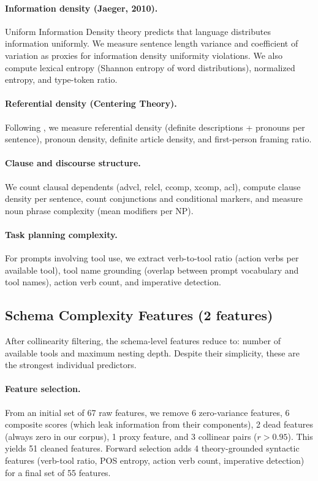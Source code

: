 \documentclass{article}
\begin{document}
\paragraph{Information density (Jaeger, 2010).}
Uniform Information Density theory predicts that language distributes information uniformly. We measure sentence length variance and coefficient of variation as proxies for information density uniformity violations. We also compute lexical entropy (Shannon entropy of word distributions), normalized entropy, and type-token ratio.

\paragraph{Referential density (Centering Theory).}
Following \citet{grosz1995centering}, we measure referential density (definite descriptions + pronouns per sentence), pronoun density, definite article density, and first-person framing ratio.

\paragraph{Clause and discourse structure.}
We count clausal dependents (advcl, relcl, ccomp, xcomp, acl), compute clause density per sentence, count conjunctions and conditional markers, and measure noun phrase complexity (mean modifiers per NP).

\paragraph{Task planning complexity.}
For prompts involving tool use, we extract verb-to-tool ratio (action verbs per available tool), tool name grounding (overlap between prompt vocabulary and tool names), action verb count, and imperative detection.

\subsection{Schema Complexity Features (2 features)}

After collinearity filtering, the schema-level features reduce to: number of available tools and maximum nesting depth. Despite their simplicity, these are the strongest individual predictors.

\paragraph{Feature selection.}
From an initial set of 67 raw features, we remove 6 zero-variance features, 6 composite scores (which leak information from their components), 2 dead features (always zero in our corpus), 1 proxy feature, and 3 collinear pairs ($r > 0.95$). This yields 51 cleaned features. Forward selection adds 4 theory-grounded syntactic features (verb-tool ratio, POS entropy, action verb count, imperative detection) for a final set of 55 features.
\end{document}
